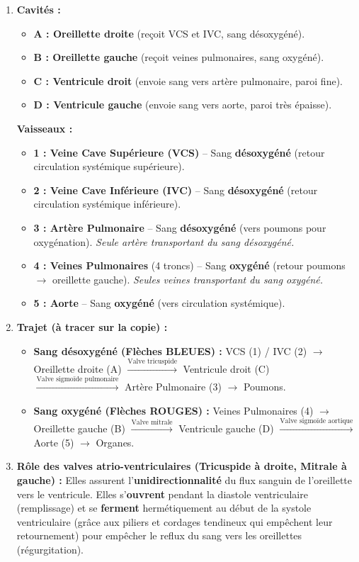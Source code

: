\documentclass[11pt]{article}
\begin{document}
\begin{corrige}
\begin{enumerate}
    \item \textbf{Cavités :}
    \begin{itemize}
        \item \textbf{A : Oreillette droite} (reçoit VCS et IVC, sang désoxygéné).
        \item \textbf{B : Oreillette gauche} (reçoit veines pulmonaires, sang oxygéné).
        \item \textbf{C : Ventricule droit} (envoie sang vers artère pulmonaire, paroi fine).
        \item \textbf{D : Ventricule gauche} (envoie sang vers aorte, paroi très épaisse).
    \end{itemize}
    \textbf{Vaisseaux :}
    \begin{itemize}
        \item \textbf{1 : Veine Cave Supérieure (VCS)} -- Sang \textbf{désoxygéné} (retour circulation systémique supérieure).
        \item \textbf{2 : Veine Cave Inférieure (IVC)} -- Sang \textbf{désoxygéné} (retour circulation systémique inférieure).
        \item \textbf{3 : Artère Pulmonaire} -- Sang \textbf{désoxygéné} (vers poumons pour oxygénation). \emph{Seule artère transportant du sang désoxygéné.}
        \item \textbf{4 : Veines Pulmonaires} (4 troncs) -- Sang \textbf{oxygéné} (retour poumons $\to$ oreillette gauche). \emph{Seules veines transportant du sang oxygéné.}
        \item \textbf{5 : Aorte} -- Sang \textbf{oxygéné} (vers circulation systémique).
    \end{itemize}
    \item \textbf{Trajet (à tracer sur la copie) :}
    \begin{itemize}
        \item \textbf{Sang désoxygéné (Flèches BLEUES) :} VCS (1) / IVC (2) $\to$ Oreillette droite (A) $\xrightarrow{\text{Valve tricuspide}}$ Ventricule droit (C) $\xrightarrow{\text{Valve sigmoïde pulmonaire}}$ Artère Pulmonaire (3) $\to$ Poumons.
        \item \textbf{Sang oxygéné (Flèches ROUGES) :} Veines Pulmonaires (4) $\to$ Oreillette gauche (B) $\xrightarrow{\text{Valve mitrale}}$ Ventricule gauche (D) $\xrightarrow{\text{Valve sigmoïde aortique}}$ Aorte (5) $\to$ Organes.
    \end{itemize}
    \item \textbf{Rôle des valves atrio-ventriculaires (Tricuspide à droite, Mitrale à gauche) :} Elles assurent l'\textbf{unidirectionnalité} du flux sanguin de l'oreillette vers le ventricule. Elles s'\textbf{ouvrent} pendant la diastole ventriculaire (remplissage) et se \textbf{ferment} hermétiquement au début de la systole ventriculaire (grâce aux piliers et cordages tendineux qui empêchent leur retournement) pour empêcher le reflux du sang vers les oreillettes (régurgitation).
\end{enumerate}
\end{corrige}
\end{document}
